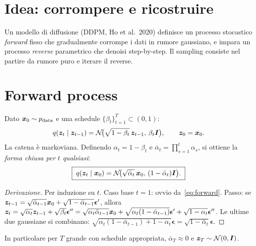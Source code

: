 \section{Idea: corrompere e ricostruire}

Un modello di diffusione (DDPM, Ho et al.\ 2020) definisce un processo stocastico \emph{forward} fisso che gradualmente corrompe i dati in rumore gaussiano, e impara un processo \emph{reverse} parametrico che denoisi step-by-step. Il sampling consiste nel partire da rumore puro e iterare il reverse.

\section{Forward process}

Dato $\bm{x}_0 \sim p_{\text{data}}$ e una schedule $\{\beta_t\}_{t=1}^T \subset (0,1)$:
\begin{equation}\label{eq:forward}
q(\bm{z}_t \mid \bm{z}_{t-1}) = \mathcal{N}\!\big(\sqrt{1-\beta_t}\, \bm{z}_{t-1},\, \beta_t \bm{I}\big), \qquad \bm{z}_0 = \bm{x}_0.
\end{equation}
La catena è markoviana. Definendo $\alpha_t = 1 - \beta_t$ e $\bar\alpha_t = \prod_{s=1}^t \alpha_s$, si ottiene la \emph{forma chiusa per $t$ qualsiasi}:
\begin{equation}\label{eq:diffusion-kernel}
\boxed{\;q(\bm{z}_t \mid \bm{x}_0) = \mathcal{N}\!\big(\sqrt{\bar\alpha_t}\, \bm{x}_0,\, (1-\bar\alpha_t)\bm{I}\big).\;}
\end{equation}

\begin{proof}[Derivazione]
Per induzione su $t$. Caso base $t=1$: ovvio da~\eqref{eq:forward}. Passo: se $\bm{z}_{t-1} = \sqrt{\bar\alpha_{t-1}}\bm{x}_0 + \sqrt{1-\bar\alpha_{t-1}}\boldsymbol{\epsilon}'$, allora $\bm{z}_t = \sqrt{\alpha_t}\bm{z}_{t-1} + \sqrt{\beta_t}\boldsymbol{\epsilon}'' = \sqrt{\alpha_t\bar\alpha_{t-1}}\bm{x}_0 + \sqrt{\alpha_t(1-\bar\alpha_{t-1})}\boldsymbol{\epsilon}' + \sqrt{1-\alpha_t}\boldsymbol{\epsilon}''$. Le ultime due gaussiane si combinano: $\sqrt{\alpha_t(1-\bar\alpha_{t-1}) + 1-\alpha_t}\boldsymbol{\epsilon} = \sqrt{1-\bar\alpha_t}\boldsymbol{\epsilon}$.
\end{proof}

In particolare per $T$ grande con schedule appropriata, $\bar\alpha_T \approx 0$ e $\bm{z}_T \sim \mathcal{N}(0, \bm{I})$.

